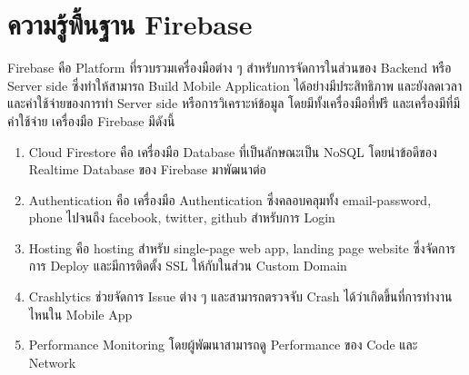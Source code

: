 	\section{ความรู้พื้นฐาน Firebase }
				Firebase  \cite{fi} คือ Platform ที่รวบรวมเครื่องมือต่าง ๆ สำหรับการจัดการในส่วนของ Backend หรือ Server side ซึ่งทำให้สามารถ Build Mobile Application ได้อย่างมีประสิทธิภาพ และยังลดเวลาและค่าใช้จ่ายของการทำ Server side หรือการวิเคราะห์ข้อมูล โดยมีทั้งเครื่องมือที่ฟรี และเครื่องมีที่มีค่าใช้จ่าย \cite{fi}
เครื่องมือ Firebase มีดังนี้
				\begin{enumerate}
					\item  Cloud Firestore คือ เครื่องมือ Database ที่เป็นลักษณะเป็น NoSQL โดยนำข้อดีของ Realtime Database ของ Firebase มาพัฒนาต่อ
					\item  Authentication  คือ  เครื่องมือ  Authentication ซึ่งคลอบคลุมทั้ง email-password, phone ไปจนถึง facebook, twitter, github สำหรับการ Login 
					\item  Hosting คือ hosting สำหรับ single-page web app, landing page website ซึ่งจัดการการ Deploy  และมีการติดตั้ง SSL ให้กับในส่วน Custom Domain  
					\item  Crashlytics ช่วยจัดการ Issue ต่าง ๆ และสามารถตรวจจับ Crash ได้ว่าเกิดขึ้นที่การทำงานไหนใน Mobile App 
					\item  Performance Monitoring  โดยผู้พัฒนาสามารถดู Performance ของ Code และ Network
				\end{enumerate}

						
			
